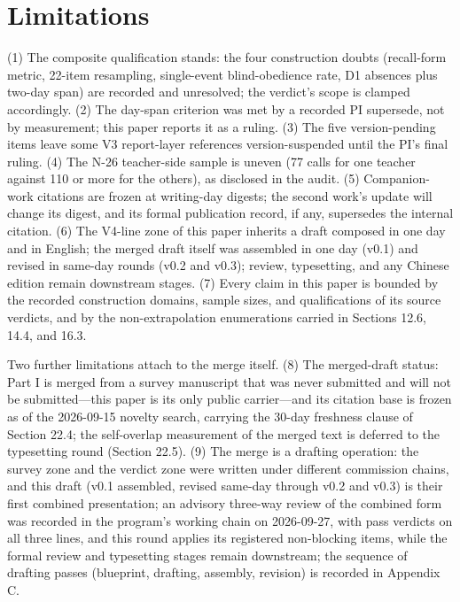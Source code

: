 \documentclass[11pt]{article}
\begin{document}
\section{Limitations}
\label{sec:21}
\noindent (1) The composite qualification stands: the four construction doubts (recall-form metric, 22-item resampling, single-event blind-obedience rate, D1 absences plus two-day span) are recorded and unresolved; the verdict's scope is clamped accordingly. (2) The day-span criterion was met by a recorded PI supersede, not by measurement; this paper reports it as a ruling. (3) The five version-pending items leave some V3 report-layer references version-suspended until the PI's final ruling. (4) The N-26 teacher-side sample is uneven (77 calls for one teacher against 110 or more for the others), as disclosed in the audit. (5) Companion-work citations are frozen at writing-day digests; the second work's update will change its digest, and its formal publication record, if any, supersedes the internal citation. (6) The V4-line zone of this paper inherits a draft composed in one day and in English; the merged draft itself was assembled in one day (v0.1) and revised in same-day rounds (v0.2 and v0.3); review, typesetting, and any Chinese edition remain downstream stages. (7) Every claim in this paper is bounded by the recorded construction domains, sample sizes, and qualifications of its source verdicts, and by the non-extrapolation enumerations carried in Sections 12.6, 14.4, and 16.3.\par
\noindent Two further limitations attach to the merge itself. (8) The merged-draft status: Part I is merged from a survey manuscript that was never submitted and will not be submitted—this paper is its only public carrier—and its citation base is frozen as of the 2026-09-15 novelty search, carrying the 30-day freshness clause of Section 22.4; the self-overlap measurement of the merged text is deferred to the typesetting round (Section 22.5). (9) The merge is a drafting operation: the survey zone and the verdict zone were written under different commission chains, and this draft (v0.1 assembled, revised same-day through v0.2 and v0.3) is their first combined presentation; an advisory three-way review of the combined form was recorded in the program's working chain on 2026-09-27, with pass verdicts on all three lines, and this round applies its registered non-blocking items, while the formal review and typesetting stages remain downstream; the sequence of drafting passes (blueprint, drafting, assembly, revision) is recorded in Appendix C.\par
\end{document}
